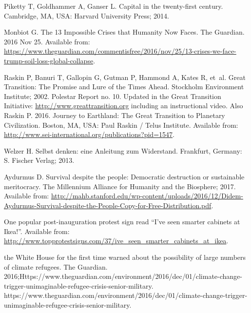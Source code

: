\documentclass[10pt,a4paper]{article}
\renewcommand*{\refname}{References and Notes}
\begin{document}
\vspace{\baselineskip}

\begin{multicols}{2}
\renewcommand*{\refname}{\normalsize{References and Notes}}

\begin{footnotesize}
%
%

\begin{thebibliography}{10}

Piketty T, Goldhammer A, Ganser L.
\newblock Capital in the twenty-first century.
\newblock Cambridge, MA, USA: Harvard University Press; 2014.

Monbiot G.
\newblock The 13 Impossible Crises that Humanity Now Faces.
\newblock The Guardian. 2016 Nov 25. Available from:
  \url{https://www.theguardian.com/commentisfree/2016/nov/25/13-crises-we-face-trump-soil-loss-global-collapse}.

Raskin P, Banuri T, Gallopin G, Gutman P, Hammond A, Kates R, et~al.
\newblock Great Transition: The Promise and Lure of the Times Ahead.
\newblock Stockholm Environment Institute; 2002. Polestar Report no. 10.
\newblock Updated in the Great Transition Initiative:
  \url{http://www.greattransition.org} including an instructional video. Also
  Raskin P. 2016. Journey to Earthland: The Great Transition to Planetary
  Civilization. Boston, MA, USA: Paul Raskin / Telus Institute.
\newblock Available from:
  \url{http://www.sei-international.org/publications?pid=1547}.

Welzer H.
\newblock Selbst denken: eine Anleitung zum Widerstand.
\newblock Frankfurt, Germany: S. Fischer Verlag; 2013.

Aydurmus D.
\newblock Survival despite the people: Democratic destruction or sustainable
  meritocracy.
\newblock The Millennium Alliance for Humanity and the Biosphere; 2017.
\newblock Available from:
  \url{http://mahb.stanford.edu/wp-content/uploads/2016/12/Didem-Aydurmus-Survival-despite-the-People-Copy-for-Free-Distribution.pdf}.

One popular post-inauguration protest sign read ``I've seen smarter cabinets at
  Ikea!''.
\newblock Available from:
  \url{http://www.topprotestsigns.com/37/ive_seen_smarter_cabinets_at_ikea}.

the White House for the first time warned about the possibility of large
  numbers of climate refugees.
\newblock The Guardian.
  2016;Https://www.theguardian.com/environment/2016/dec/01/climate-change-trigger-unimaginable-refugee-crisis-senior-military.
\newblock
  https://www.theguardian.com/environment/2016/dec/01/climate-change-trigger-unimaginable-refugee-crisis-senior-military.


\end{thebibliography}
\end{footnotesize}
\end{multicols}
\end{document}
